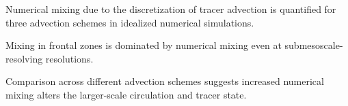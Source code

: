 \documentclass[draft]{agujournal2019}
\begin{document}





\begin{keypoints}
\item Numerical mixing due to the discretization of tracer advection is quantified for three advection schemes in idealized numerical simulations.
\item Mixing in frontal zones is dominated by numerical mixing even at submesoscale-resolving resolutions.
\item Comparison across different advection schemes suggests increased numerical mixing alters the larger-scale circulation and tracer state.
\end{keypoints}

%
%

%
%
\end{document}
